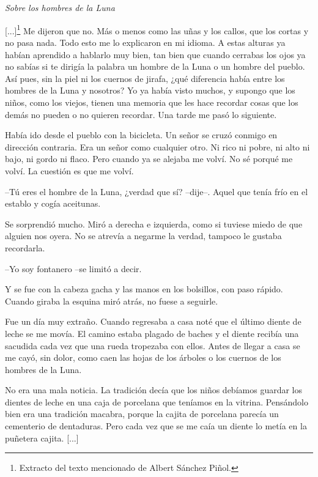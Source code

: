 \documentclass[a4paper]{tufte-handout}
\begin{document}
\section*{}{\emph{{\Large Sobre los hombres de la Luna}}}
\vspace{1\baselineskip}

[...]\footnote{Extracto del texto mencionado de Albert Sánchez Piñol.} 
Me dijeron que no. Más o menos como las uñas y los callos, que los cortas y no pasa nada. Todo esto me lo explicaron en mi idioma. A estas alturas ya habían aprendido a hablarlo muy bien, tan bien que cuando cerrabas los ojos ya no sabías si te dirigía la palabra un hombre de la Luna o un hombre del pueblo. Así pues, sin la piel ni los cuernos de jirafa, ¿qué diferencia había entre los hombres de la Luna y nosotros? Yo ya había visto muchos, y supongo que los niños, como los viejos, tienen una memoria que les hace recordar cosas que los demás no pueden o no quieren recordar. Una tarde me pasó lo siguiente.

Había ido desde el pueblo con la bicicleta. Un señor se cruzó conmigo en dirección contraria. Era un señor como cualquier otro. Ni rico ni pobre, ni alto ni bajo, ni gordo ni flaco. Pero cuando ya se alejaba me volví. No sé porqué me volví. La cuestión es que me volví.

--Tú eres el hombre de la Luna, ¿verdad que sí? --dije--. Aquel que tenía frío en el establo y cogía aceitunas.

Se sorprendió mucho. Miró a derecha e izquierda, como si tuviese miedo de que alguien nos oyera. No se atrevía a negarme la verdad, tampoco le gustaba recordarla.

--Yo soy fontanero --se limitó a decir.

Y se fue con la cabeza gacha y las manos en los bolsillos, con paso rápido. Cuando giraba la esquina miró atrás, no fuese a seguirle.

Fue un día muy extraño. Cuando regresaba a casa noté que el último diente de leche se me movía. El camino estaba plagado de baches y el diente recibía una sacudida cada vez que una rueda tropezaba con ellos. Antes de llegar a casa se me cayó, sin dolor, como caen las hojas de los árboles o los cuernos de los hombres de la Luna.

No era una mala noticia. La tradición decía que los niños debíamos guardar los dientes de leche en una caja de porcelana que teníamos en la vitrina. Pensándolo bien era una tradición macabra, porque la cajita de porcelana parecía un cementerio de dentaduras. Pero cada vez que se me caía un diente lo metía en la puñetera cajita. [...]
\end{document}
